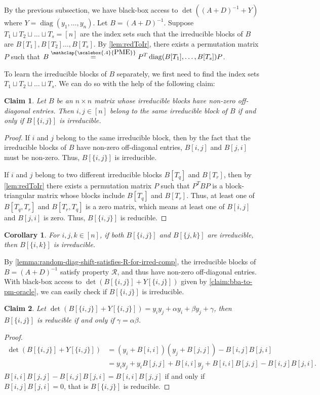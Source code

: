 \documentclass[11pt,letterpaper]{article}
\DeclareMathOperator*{\diag}{diag}
\newtheorem{claim}{Claim}[section]
\newtheorem{corollary}{Corollary}[section]
\newcommand{\PME}{\stackrel{\mathclap{\scalebox{.4}{\mbox{PME}}}}{=}}
\newcommand{\prop}{\mathcal{R}}
\begin{document}
{{{By the previous subsection, we have black-box access to $\det((A+D)^{-1} + Y)$ where $Y= \diag(y_1,\dots,y_n)$. Let $B = (A+D)^{-1}$. Suppose $T_1 \sqcup T_2 \sqcup \dots \sqcup T_s = [n]$ are the index sets such that the irreducible blocks of $B$ are $B[T_1],B[T_2]\dots,B[T_s]$. By \cref{lem:redToIr}, there exists a permutation matrix $P$ such that $B \PME P^{T}\diag(B[T_1],\dots,B[T_s]) P$.

To learn the irreducible blocks of $B$ separately, we first need to find the index sets $T_1 \sqcup T_2 \sqcup \dots \sqcup T_s$. We can do so with the help of the following claim:

\begin{claim} Let $B$ be an $n \times n$ matrix whose irreducible blocks have non-zero off-diagonal entries. Then $i,j \in [n]$ belong to the same irreducible block of $B$ if and only if $B[\{i,j\}]$ is irreducible.\end{claim}
\begin{proof}
    If $i$ and $j$ belong to the same irreducible block, then by the fact that the irreducible blocks of $B$ have non-zero off-diagonal entries, $B[i,j]$ and $B[j,i]$ must be non-zero. Thus, $B[\{i,j\}]$ is irreducible.

    If $i$ and $j$ belong to two different irreducible blocks $B[T_q]$ and $B[T_r]$, then by \cref{lem:redToIr} there exists a permutation matrix $P$ such that $P^TBP$ is a block-triangular matrix whose blocks include $B[T_q]$ and $B[T_r]$. Thus, at least one of $B[T_q,T_r]$ and $B[T_r,T_q]$ is a zero matrix, which means at least one of $B[i,j]$ and $B[j,i]$ is zero. Thus, $B[\{i,j\}]$ is reducible.
\end{proof}
\begin{corollary}\label{cor:off_diagonal_non_zero_irred_block_transitivity}
    For $i,j,k \in [n]$, if both $B[\{i,j\}]$ and $B[\{j,k\}]$ are irreducible, then $B[\{i,k\}]$ is irreducible.
\end{corollary}

By \cref{lemma:random-diag-shift-satisfies-R-for-irred-comp}, the irreducible blocks of $B = (A+D)^{-1}$ satisfy property $\prop$, and thus have non-zero off-diagonal entries. With black-box access to $\det(B[\{i,j\}] + Y[\{i,j\}])$ given by \cref{claim:bba-to-pm-oracle}, we can easily check if $B[\{i,j\}]$ is irreducible.

\begin{claim} \label{clm:checking 2x2 reducibility}
    Let $\det(B[\{i,j\}] + Y[\{i,j\}]) = y_iy_j + \alpha y_i + \beta y_j + \gamma$, then $B[\{i,j\}]$ is reducible if and only if $\gamma = \alpha\beta$.
\end{claim}
\begin{proof}
    \begin{align*}\det(B[\{i,j\}] + Y[\{i,j\}]) &= (y_i + B[i,i])(y_j + B[j,j]) - B[i,j]B[j,i] \\
        &= y_iy_j + y_iB[j,j] + B[i,i]y_j + B[i,i]B[j,j] - B[i,j]B[j,i]\text{.}\end{align*}
    $B[i,i]B[j,j] - B[i,j]B[j,i] = B[i,i]B[j,j]$ if and only if $B[i,j]B[j,i] = 0$, that is $B[\{i,j\}]$ is reducible.
\end{proof}

}}}
\end{document}
